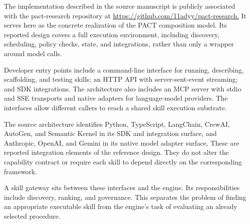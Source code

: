 \documentclass[10pt,twocolumn,a4paper]{article}
\begin{document}
The implementation described in the source manuscript is publicly associated with the pact-research repository at \url{https://github.com/11adyy/pact-research.} It serves here as the concrete realization of the PACT composition model. Its reported design covers a full execution environment, including discovery, scheduling, policy checks, state, and integrations, rather than only a wrapper around model calls.


Developer entry points include a command-line interface for running, describing, scaffolding, and testing skills; an HTTP API with server-sent-event streaming; and SDK integrations. The architecture also includes an MCP server with stdio and SSE transports and native adapters for language-model providers. The interfaces allow different callers to reach a shared skill execution substrate.


The source architecture identifies Python, TypeScript, LangChain, CrewAI, AutoGen, and Semantic Kernel in its SDK and integration surface, and Anthropic, OpenAI, and Gemini in its native model adapter surface. These are reported integration elements of the reference design. They do not alter the capability contract or require each skill to depend directly on the corresponding framework.


A skill gateway sits between these interfaces and the engine. Its responsibilities include discovery, ranking, and governance. This separates the problem of finding an appropriate executable skill from the engine's task of evaluating an already selected procedure.
\end{document}
